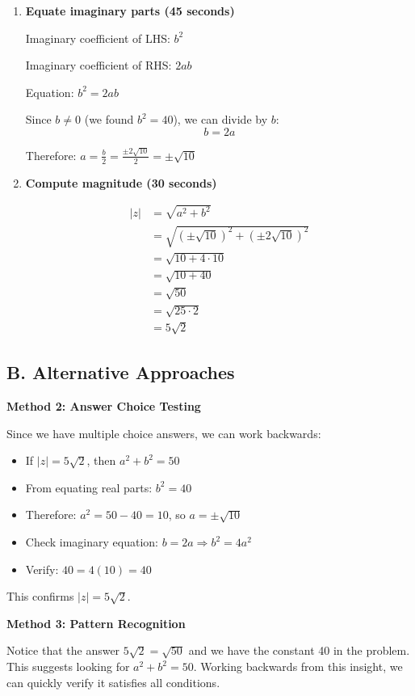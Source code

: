 \documentclass[12pt]{article}
\begin{document}
\begin{solutionbox}
\begin{enumerate}[leftmargin=*]
    \item \textbf{Equate imaginary parts (45 seconds)}
    
    Imaginary coefficient of LHS: $b^2$
    
    Imaginary coefficient of RHS: $2ab$
    
    Equation: $b^2 = 2ab$
    
    Since $b \neq 0$ (we found $b^2 = 40$), we can divide by $b$:
    $$b = 2a$$
    
    Therefore: $a = \frac{b}{2} = \frac{\pm 2\sqrt{10}}{2} = \pm\sqrt{10}$
    
    \item \textbf{Compute magnitude (30 seconds)}
    
    \begin{align*}
        |z| &= \sqrt{a^2 + b^2}\\
        &= \sqrt{(\pm\sqrt{10})^2 + (\pm 2\sqrt{10})^2}\\
        &= \sqrt{10 + 4 \cdot 10}\\
        &= \sqrt{10 + 40}\\
        &= \sqrt{50}\\
        &= \sqrt{25 \cdot 2}\\
        &= 5\sqrt{2}
    \end{align*}
\end{enumerate}

\subsection*{B. Alternative Approaches}

\textbf{Method 2: Answer Choice Testing}

Since we have multiple choice answers, we can work backwards:

\begin{itemize}
    \item If $|z| = 5\sqrt{2}$, then $a^2 + b^2 = 50$
    \item From equating real parts: $b^2 = 40$
    \item Therefore: $a^2 = 50 - 40 = 10$, so $a = \pm\sqrt{10}$
    \item Check imaginary equation: $b = 2a \Rightarrow b^2 = 4a^2$
    \item Verify: $40 = 4(10) = 40$ \checkmark
\end{itemize}

This confirms $|z| = 5\sqrt{2}$.

\textbf{Method 3: Pattern Recognition}

Notice that the answer $5\sqrt{2} = \sqrt{50}$ and we have the constant 40 in the problem. This suggests looking for $a^2 + b^2 = 50$. Working backwards from this insight, we can quickly verify it satisfies all conditions.
\end{solutionbox}
\end{document}
